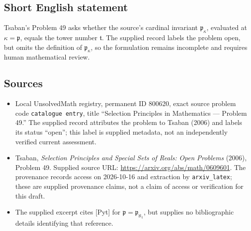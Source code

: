 \documentclass[11pt]{article}
\begin{document}
\subsection{Short English statement}
Tsaban's Problem 49 asks whether the source's cardinal invariant $\mathfrak p_\kappa$, evaluated at $\kappa=\mathfrak p$, equals the tower number $\mathfrak t$. The supplied record labels the problem open, but omits the definition of $\mathfrak p_\kappa$, so the formulation remains incomplete and requires human mathematical review.
\subsection{Sources}
\begin{itemize}
\item Local UnsolvedMath registry, permanent ID 800620, exact source problem code \texttt{catalogue entry}, title ``Selection Principles in Mathematics --- Problem 49.'' The supplied record attributes the problem to Tsaban (2006) and labels its status ``open''; this label is supplied metadata, not an independently verified current assessment.
\item Tsaban, \emph{Selection Principles and Special Sets of Reals: Open Problems} (2006), Problem 49. Supplied source URL: \url{https://arxiv.org/abs/math/0609601}. The provenance records access on 2026-10-16 and extraction by \texttt{arxiv\_latex}; these are supplied provenance claims, not a claim of access or verification for this draft.
\item The supplied excerpt cites [Pyt] for $\mathfrak p=\mathfrak p_{\aleph_1}$, but supplies no bibliographic details identifying that reference.
\end{itemize}
\end{document}
